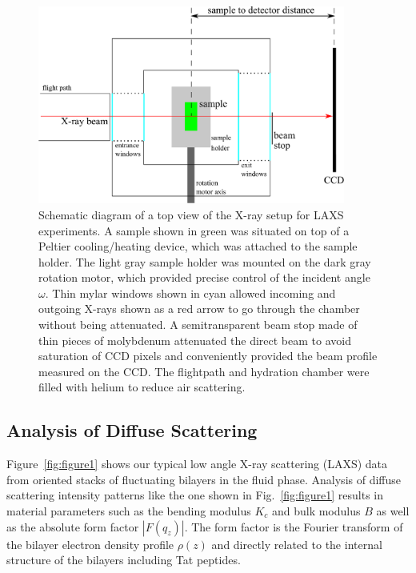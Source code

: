 \begin{figure}[htbp]
  \centering
  \includegraphics[width=0.9\textwidth]{figures/Tat/MMs/chamber_geometry}
  \caption[Schematic diagram of the X-ray setup for LAXS experiments.]
  {Schematic diagram of a top view of the X-ray setup for LAXS experiments.
  A sample shown in green was situated on top of a Peltier cooling/heating
  device, which was attached to the sample holder. The light gray 
  sample holder was mounted on the dark gray rotation motor, which provided 
  precise control of the incident angle $\omega$. Thin mylar windows shown 
  in cyan allowed incoming
  and outgoing X-rays shown as a red arrow to go through the chamber without 
  being attenuated.
  A semitransparent beam stop made of thin pieces of molybdenum attenuated
  the direct beam to avoid saturation of CCD pixels and conveniently provided 
  the beam profile measured on the CCD. The flightpath and hydration chamber
  were filled with helium to reduce air scattering.}
  \label{fig:x-ray_setup}
\end{figure}

\subsection{Analysis of Diffuse Scattering}\label{sec:diffuse_analysis}
Figure~\ref{fig:figure1} shows our typical low angle X-ray scattering (LAXS) data 
from oriented stacks of fluctuating bilayers in the fluid phase. Analysis of diffuse scattering 
intensity patterns like the one shown in Fig.~\ref{fig:figure1} results in material 
parameters such as the bending modulus $K_c$ and bulk modulus $B$ as well as
the absolute form factor $|F(q_z)|$. 
The form factor is the Fourier transform of the bilayer electron 
density profile $\rho(z)$ and directly related to the internal structure of the
bilayers including Tat peptides.

